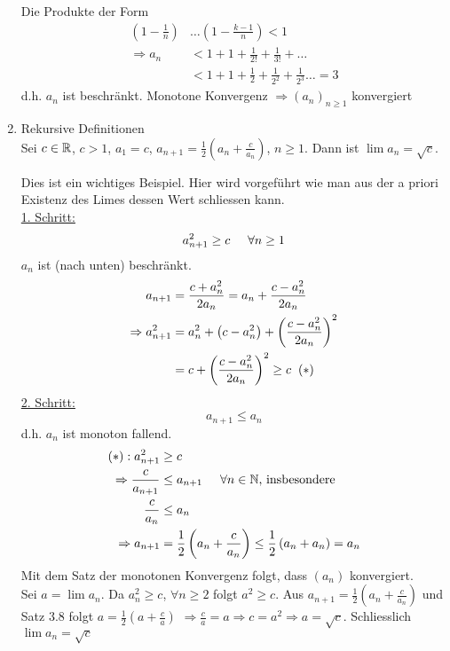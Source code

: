 \begin{enumerate}
\begin{beweis}{}
\noindent Die Produkte der Form
\begin{align*}
\left( {1 - \frac{1}{n}} \right) &\ldots \left( {1 - \frac{{k - 1}}{n}} \right) < 1\\
 \Rightarrow {a_n} &< 1 + 1 + \frac{1}{{2!}} + \frac{1}{{3!}} +  \ldots \\
&< 1 + 1 + \frac{1}{2} + \frac{1}{{{2^2}}} + \frac{1}{{{2^3}}} \ldots  = 3
\end{align*}
d.h. $a_n$ ist beschränkt. Monotone Konvergenz $\Rightarrow \left( a_n\right)_{n\geq 1}$ konvergiert
\end{beweis}
\item Rekursive Definitionen\\
Sei $c \in\mathbb{R}$, $c > 1$, $a_1=c$, ${a_{n + 1}} = \frac{1}{2}\left( {{a_n} + \frac{c}{{{a_n}}}} \right)$, $n\geq 1$. Dann ist $\lim a_n=\sqrt{c}$.
\begin{beweis}{}
Dies ist ein wichtiges Beispiel. Hier wird vorgeführt wie man aus der a priori Existenz des Limes dessen Wert schliessen kann.\\

\noindent\underline{1. Schritt:}
\[a_{n + 1}^2 \ge c\hspace{5mm}\forall n\geq 1\]
$a_n$ ist (nach unten) beschränkt.
\begin{align*}
{a_{n + 1}} &= \frac{{c + a_n^2}}{{2a_n}} = {a_n} + \frac{{c - a_n^2}}{{2{a_n}}}\\
 \Rightarrow a_{n + 1}^2 &= a_n^2 + \left( {c - a_n^2} \right) + {\left( {\frac{{c - a_n^2}}{{2{a_n}}}} \right)^2}\\
 &= c + {\left( {\frac{{c - a_n^2}}{{2{a_n}}}} \right)^2} \ge c\hspace{2mm}\text{(\textasteriskcentered)}
\end{align*}
\noindent\underline{2. Schritt:}
\[a_{n+1}\leq a_n\]
d.h. $a_n$ ist monoton fallend.
\begin{align*}
\text{(\textasteriskcentered)}: a_{n+1}^2&\geq c\\
\Rightarrow\frac{c}{a_{n+1}}&\leq a_{n+1}\hspace{5mm} \forall n\in\N\text{, insbesondere}\\
\frac{c}{a_n}&\leq a_n \\
\Rightarrow a_{n+1}&=\frac{1}{2}\left( {{a_n} + \frac{c}{{{a_n}}}} \right) \le \frac{1}{2}\left( {{a_n} + {a_n}} \right) = {a_n}
\end{align*}
Mit dem Satz der monotonen Konvergenz folgt, dass $\left( a_n\right)$ konvergiert.\\

\noindent Sei $a=\lim a_n$. Da $a_n^2\geq c$, $\forall n\geq 2$ folgt $a^2\geq c$. Aus $a_{n+1}=\frac{1}{2}\left( a_n+\frac{c}{a_n}\right)$ und Satz 3.8 folgt $a=\frac{1}{2}\left( a+\frac{c}{a}\right)$ $\Rightarrow\frac{c}{a}=a\Rightarrow c=a^2\Rightarrow a=\sqrt{c}$. Schliesslich $\lim a_n=\sqrt{c}$
\end{beweis}
\end{enumerate}

